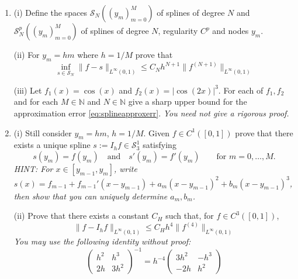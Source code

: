 \documentclass{exams}
\newcommand{\N}{\mathbb{N}}
\begin{document}
\begin{examcomp1}
\begin{question}
\begin{enumerate}
  \item (i) Define the spaces $\mathcal{S}_N((y_m)_{m=0}^M)$ of splines of
    degree $N$ and  $\mathcal{S}_N^p((y_m)_{m=0}^M)$ of splines of degree $N$,
    regularity $C^p$ and nodes $y_m$. 

    (ii) For $y_m = h m$ where $h = 1/M$ prove that  
    \begin{equation} \label{eq:splineapproxerr}
        \inf_{s \in \mathcal{S}_N} \|f - s \|_{L^\infty(0,1)}
        \leq 
        C_N h^{N+1} \| f^{(N+1)} \|_{L^\infty(0,1)}
    \end{equation}

    (iii) Let $f_1(x) = \cos(x)$ and $f_2(x) = |\cos(2x)|^3$. 
    For each of $f_1, f_2$ and for each $M \in \N$ and $N \in \N$ give a
    sharp upper bound for the approximation error \eqref{eq:splineapproxerr}.
    {\it You need not give a rigorous proof.}

  \item (i) Still consider $y_m = h m$, $h = 1/M$. Given $f \in C^1([0,1])$
  prove that there exists a unique spline $s := I_h f \in \mathcal{S}_3^1$
  satisfying  
  \[
      s(y_m) = f(y_m) \quad \text{and} 
      \quad 
      s'(y_m) = f'(y_m) \qquad \text{for } m = 0, \dots, M.
  \]
  {\it HINT: For $x \in [y_{m-1}, y_m]$, write 
  $s(x) = f_{m-1} + f_{m-1}' (x-y_{m-1}) + a_m (x-y_{m-1})^2 
    + b_m (x - y_{m-1})^3$, then show that you can uniquely 
    determine $a_m, b_m$.}

  (ii) Prove that there exists a constant $C_H$ such that, 
  for $f \in C^3([0,1])$,   
  \[
      \| f - I_h f \|_{L^\infty(0,1)} \leq C_H h^4 \|f^{(4)}\|_{L^\infty(0,1)}
  \]  
  {\it You may use the following identity without proof:
    \[
      \begin{pmatrix} 
        h^2 & h^3 \\ 
        2h & 3h^2 
      \end{pmatrix}^{-1}
      = 
      h^{-4} 
      \begin{pmatrix}
        3 h^2 & - h^3 \\ 
        -2h & h^2 
      \end{pmatrix}
    \] 
  }

  \end{enumerate}
\end{question}

\clearpage

\begin{question}
  \begin{enumerate}


\end{enumerate}
\end{question}
\end{examcomp1}
\end{document}
